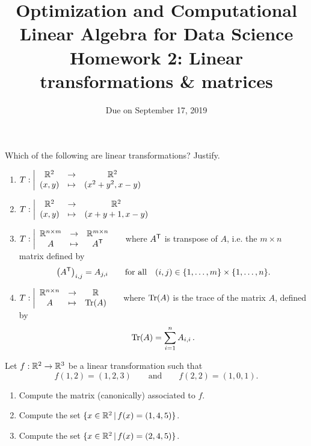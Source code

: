 \documentclass[11pt,nocut]{article}
\title{\vspace{-2.0cm}%
	Optimization and Computational Linear Algebra for Data Science\\
Homework 2: Linear transformations \& matrices}
\date{\vspace{-1cm}Due on September 17, 2019}
\begin{document}
\maketitle


\begin{problem}[2 points]
	Which of the following are linear transformations? Justify.
	\begin{enumerate}[label=\normalfont(\textbf{\alph*})]
		\item 
			$\displaystyle
			T: \left| 
			\begin{array}{ccc}
				\mathbb{R}^2 & \to & \mathbb{R}^2 \\
				(x,y) & \mapsto & (x^2+y^2, x-y)
			\end{array}
		\right.
		$
		\item 
			$\displaystyle
			T: \left| 
			\begin{array}{ccc}
				\mathbb{R}^2 & \to & \mathbb{R}^2 \\
				(x,y) & \mapsto & (x+y+1, x-y)
			\end{array}
		\right.
		$
	\item 
			$\displaystyle
			T: \left| 
			\begin{array}{ccc}
				\mathbb{R}^{n \times m} & \to & \mathbb{R}^{m \times n} \\
				A & \mapsto & A^{{\sf T}}
			\end{array}
		\right.
		\quad$ where $A^{{\sf T}}$ is transpose of $A$, i.e. the $m \times n$ matrix defined by
		$$
		\big(A^{{\sf T}}\big)_{i,j} = A_{j,i} \qquad \text{for all} \quad (i,j) \in \{1, \dots, m\}\times \{1, \dots, n\}.
		$$
	\item 
			$\displaystyle
			T: \left| 
			\begin{array}{ccc}
				\mathbb{R}^{n \times n} & \to & \mathbb{R} \\
				A & \mapsto & {{\rm Tr}}(A)
			\end{array}
		\right.\quad$ where ${{\rm Tr}}(A)$ is the trace of the matrix $A$, defined by 
		$${{\rm Tr}}(A) = \sum_{i=1}^n A_{i,i} \,.$$
	\end{enumerate}
\end{problem}

\vspace{5mm}

\begin{problem}[3 points]
	Let $f: \mathbb{R}^2 \to \mathbb{R}^3$ be a linear transformation such that
	$$
	f(1,2) = (1,2,3)
	\qquad \text{and} \qquad f(2,2) = (1,0,1).
	$$
	\begin{enumerate}[label=\normalfont(\textbf{\alph*})]
		\item Compute the matrix (canonically) associated to $f$.
		\item Compute the set $\{x \in \mathbb{R}^2 \, | \, f(x) = (1,4,5) \}$.
		\item Compute the set $\{x \in \mathbb{R}^2 \, | \, f(x) = (2,4,5) \}$.
	\end{enumerate}
\end{problem}
\vspace{5mm}
\end{document}
